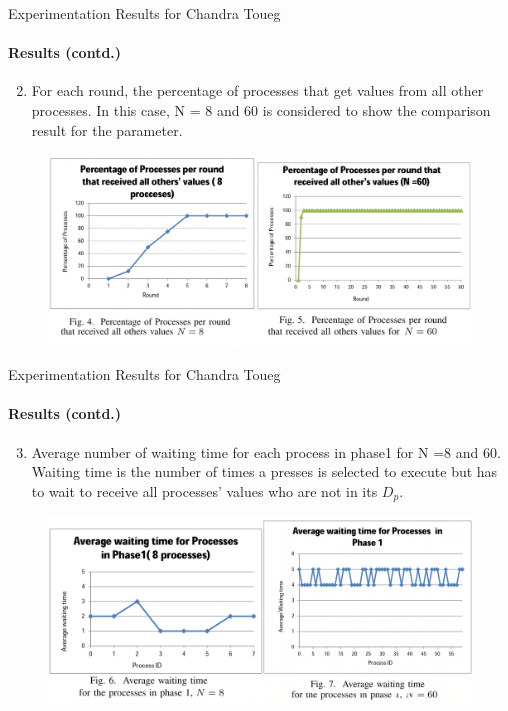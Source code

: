 \documentclass[11pt]{beamer}              %
\begin{document}
\begin{frame}{Experimentation Results for Chandra Toueg}
\framesubtitle{Results (contd.)}
    \begin{enumerate}
    \setcounter{enumi}{1}
    \item For each round, the percentage of processes that get values from all other processes. In this case,
    N = 8 and 60 is considered to show the comparison result for the parameter.
\end{enumerate}
\begin{figure}
    \centering
    \includegraphics[scale=0.25]{fig4.png}
    \label{fig:chandra_toueg_sudo}
\end{figure}
\end{frame}

\begin{frame}{Experimentation Results for Chandra Toueg}
\framesubtitle{Results (contd.)}
\begin{enumerate}
\setcounter{enumi}{2}
\item Average number of waiting time for
each process in phase1 for N =8 and 60. Waiting time is the number of times a presses is selected to execute but has to
wait to receive all processes’ values who are not in its \(D_p\).
\end{enumerate}
\begin{figure}
    \centering
    \includegraphics[scale=0.25]{fig6.png}
    \label{fig:chandra_toueg_sudo}
\end{figure}
\end{frame}
\end{document}
